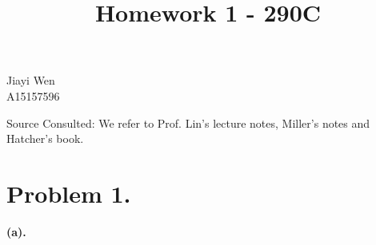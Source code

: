 \documentclass[12pt]{amsart}
\begin{document}
\title{Homework 1 - 290C}
\maketitle
\begin{center}
    Jiayi Wen\\
    A15157596
\end{center}
Source Consulted: We refer to Prof. Lin's lecture notes, Miller's notes and Hatcher's book. \\
\section*{Problem 1.}
\textbf{(a).}
\end{document}
